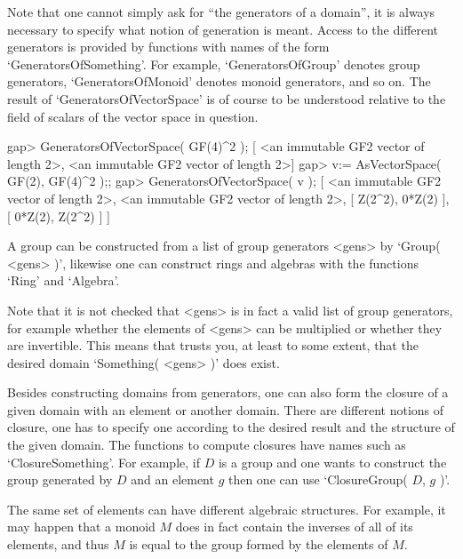 Note that one cannot simply ask for ``the generators of a domain'',
it is always necessary to specify what notion of generation is meant.
Access to the different generators is provided by functions with
names of the form `GeneratorsOfSomething'.
For example, `GeneratorsOfGroup' denotes group generators,
`GeneratorsOfMonoid' denotes monoid generators, and so on.
The result of `GeneratorsOfVectorSpace' is of course to be understood
relative to the field of scalars of the vector space in question.

\beginexample
gap> GeneratorsOfVectorSpace( GF(4)^2 );
[ <an immutable GF2 vector of length 2>,
  <an immutable GF2 vector of length 2>]
gap> v:= AsVectorSpace( GF(2), GF(4)^2 );;
gap> GeneratorsOfVectorSpace( v );
[ <an immutable GF2 vector of length 2>,
  <an immutable GF2 vector of length 2>, [ Z(2^2), 0*Z(2) ], 
  [ 0*Z(2), Z(2^2) ] ]
\endexample



A group can be constructed from a list of group generators <gens> by
`Group( <gens> )',
likewise one can construct rings and algebras with the functions `Ring'
and `Algebra'.

Note that it is not checked that <gens> is in fact a valid list of group
generators, for example whether the elements of <gens> can be multiplied
or whether they are invertible.
This means that {\GAP} trusts you, at least to some extent, that the
desired domain `Something( <gens> )' does exist.



Besides constructing domains from generators, one can also form the
closure of a given domain with an element or another domain.
There are different notions of closure, one has to specify one
according to the desired result and the structure of the given domain.
The functions to compute closures have names such as
`ClosureSomething'.
For example, if $D$ is a group and one wants to construct the group
generated by $D$ and an element $g$ then one can use
`ClosureGroup( $D$, $g$ )'.



The same set of elements can have different algebraic structures.
For example, it may happen that a monoid $M$ does in fact contain
the inverses of all of its elements, and thus $M$ is equal to the group
formed by the elements of $M$.

